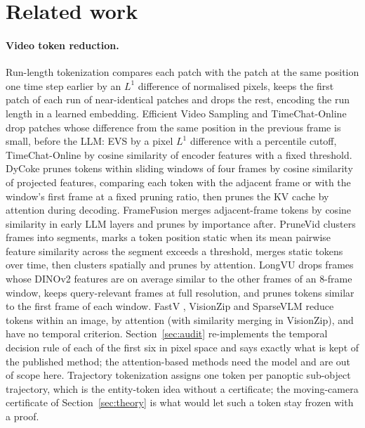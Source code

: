 \section{Related work}
\label{sec:related}

\paragraph{Video token reduction.} Run-length tokenization \citep{choudhury2024rlt} compares each patch with the patch at the same position one time step earlier by an $L^1$ difference of normalised pixels, keeps the first patch of each run of near-identical patches and drops the rest, encoding the run length in a learned embedding. Efficient Video Sampling \citep{evs2025} and TimeChat-Online \citep{yao2025timechatonline} drop patches whose difference from the same position in the previous frame is small, before the LLM: EVS by a pixel $L^1$ difference with a percentile cutoff, TimeChat-Online by cosine similarity of encoder features with a fixed threshold. DyCoke \citep{tao2025dycoke} prunes tokens within sliding windows of four frames by cosine similarity of projected features, comparing each token with the adjacent frame or with the window's first frame at a fixed pruning ratio, then prunes the KV cache by attention during decoding. FrameFusion \citep{fu2024framefusion} merges adjacent-frame tokens by cosine similarity in early LLM layers and prunes by importance after. PruneVid \citep{huang2025prunevid} clusters frames into segments, marks a token position static when its mean pairwise feature similarity across the segment exceeds a threshold, merges static tokens over time, then clusters spatially and prunes by attention. LongVU \citep{shen2024longvu} drops frames whose DINOv2 features are on average similar to the other frames of an 8-frame window, keeps query-relevant frames at full resolution, and prunes tokens similar to the first frame of each window. FastV \citep{chen2024fastv}, VisionZip \citep{yang2025visionzip} and SparseVLM \citep{zhang2024sparsevlm} reduce tokens within an image, by attention (with similarity merging in VisionZip), and have no temporal criterion. Section~\ref{sec:audit} re-implements the temporal decision rule of each of the first six in pixel space and says exactly what is kept of the published method; the attention-based methods need the model and are out of scope here. Trajectory tokenization \citep{zhang2025trajectory} assigns one token per panoptic sub-object trajectory, which is the entity-token idea without a certificate; the moving-camera certificate of Section~\ref{sec:theory} is what would let such a token stay frozen with a proof.

